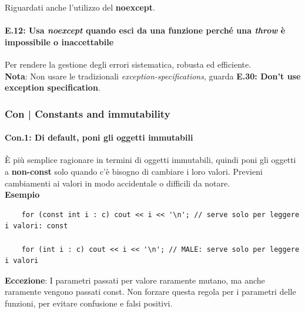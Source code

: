 \textsf{\small Riguardati anche l'utilizzo del \textbf{noexcept}.} \\

\paragraph{E.12: Usa \emph{noexcept} quando esci da una funzione perché una \emph{throw} è impossibile o inaccettabile}

\textsf{\small Per rendere la gestione degli errori sistematica, robusta ed efficiente.} \\

\textsf{\small \textbf{Nota}: Non usare le tradizionali \emph{exception-specifications}, guarda \textbf{E.30: Don't use exception specification}.} \\



\newpage

\subsubsection{Con | Constants and immutability}

\paragraph{Con.1: Di default, poni gli oggetti immutabili}

\textsf{\small È più semplice ragionare in termini di oggetti immutabili, quindi poni gli oggetti a \textbf{non-const} solo quando c'è bisogno di cambiare i loro valori. Previeni cambiamenti ai valori in modo accidentale o difficili da notare. } \\

\textsf{\small \textbf{Esempio}}

\begin{lstlisting}
	for (const int i : c) cout << i << '\n'; // serve solo per leggere i valori: const
	
	for (int i : c) cout << i << '\n'; // MALE: serve solo per leggere i valori
\end{lstlisting}

\textsf{\small \textbf{Eccezione}: I parametri passati per valore raramente mutano, ma anche raramente vengono passati const. Non forzare questa regola per i parametri delle funzioni, per evitare confusione e falsi positivi.} \\

